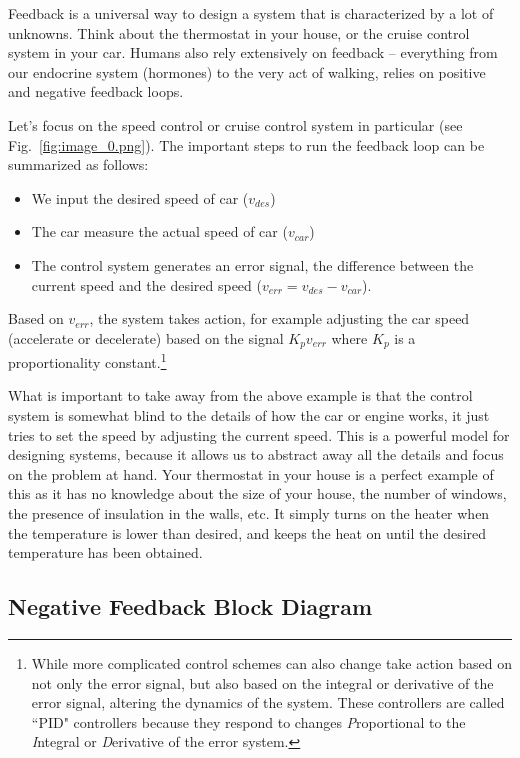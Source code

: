 Feedback is a universal way to design a system that is characterized by a lot of unknowns.  Think about the thermostat in your house, or the cruise control system in your car.  Humans also rely extensively on feedback -- everything from our endocrine system (hormones) to the very act of walking, relies on positive and negative feedback loops.  

Let's focus on the speed control or cruise control system in particular (see Fig.~\ref{fig:image_0.png}).  The important steps to run the feedback loop can be summarized as follows:
\begin{itemize}
\item We input the desired speed of car ($v_{des}$)
\item The car measure the actual speed of car ($v_{car}$)
\item The control system generates an error signal, the difference between the current speed and the desired speed ($v_{err} = v_{des} - v_{car}$).
\end{itemize}

Based on $v_{err}$, the system takes action, for example adjusting the car speed (accelerate or decelerate) based on the signal $K_p v_{err}$ where $K_p$ is a proportionality constant.\footnote{While more complicated control schemes can also change take action based on not only the error signal, but also based on the integral or derivative of the error signal, altering the dynamics of the system.  These controllers are called ``PID" controllers because they respond to changes \emph{P}roportional to the \emph{I}ntegral or \emph{D}erivative of the error system.}

What is important to take away from the above example is that the control system is somewhat blind to the details of how the car or engine works, it just tries to set the speed by adjusting the current speed.  This is a powerful model for designing systems, because it allows us to abstract away all the details and focus on the problem at hand.  Your thermostat in your house is a perfect example of this as it has no knowledge about the size of your house, the number of windows, the presence of insulation in the walls, etc.  It simply turns on the heater when the temperature is lower than desired, and keeps the heat on until the desired temperature has been obtained.  
 
 

\subsection{Negative Feedback Block Diagram}

